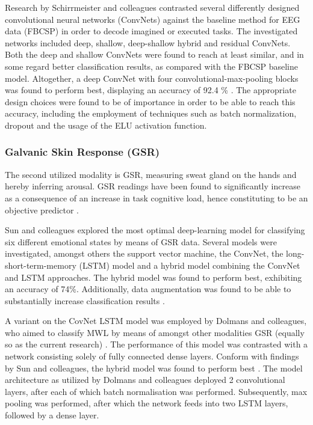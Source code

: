 \documentclass{article}
\begin{document}
Research by Schirrmeister and colleagues contrasted several differently designed convolutional neural networks (ConvNets) against the baseline method for EEG data (FBCSP) in order to decode imagined or executed tasks. The investigated networks included deep, shallow, deep-shallow hybrid and residual ConvNets. Both the deep and shallow ConvNets were found to reach at least similar, and in some regard better classification results, as compared with the FBCSP baseline model. Altogether, a deep ConvNet with four convolutional-max-pooling blocks was found to perform best, displaying an accuracy of 92.4 \% \cite{schirrmeister2017deep}. The appropriate design choices were found to be of importance in order to be able to reach this accuracy, including the employment of techniques such as batch normalization, dropout and the usage of the ELU activation function.

\subsubsection{Galvanic Skin Response (GSR)}
The second utilized modality is GSR, measuring sweat gland on the hands and hereby inferring arousal. GSR readings have been found to significantly increase as a consequence of an increase in task cognitive load, hence constituting to be an objective predictor \cite{shi2007galvanic}. 

Sun and colleagues explored the most optimal deep-learning model for classifying six different emotional states by means of GSR data. Several models were investigated, amongst others the support vector machine, the ConvNet, the long-short-term-memory (LSTM) model and a hybrid model combining the ConvNet and LSTM approaches. The hybrid model was found to perform best, exhibiting an accuracy of 74\%. Additionally, data augmentation was found to be able to substantially increase classification results \cite{sun2019hybrid}. 

A variant on the CovNet LSTM model was employed by Dolmans and colleagues, who aimed to classify MWL by means of amongst other modalities GSR (equally so as the current research) \cite{dolmans2020perceived}. The performance of this model was contrasted with a network consisting solely of fully connected dense layers. Conform with findings by Sun and colleagues, the hybrid model was found to perform best \cite{dolmans2020perceived}. The model architecture as utilized by Dolmans and colleagues deployed 2 convolutional layers, after each of which batch normalisation was performed. Subsequently, max pooling was performed, after which the network feeds into two LSTM layers, followed by a dense layer.
\end{document}
